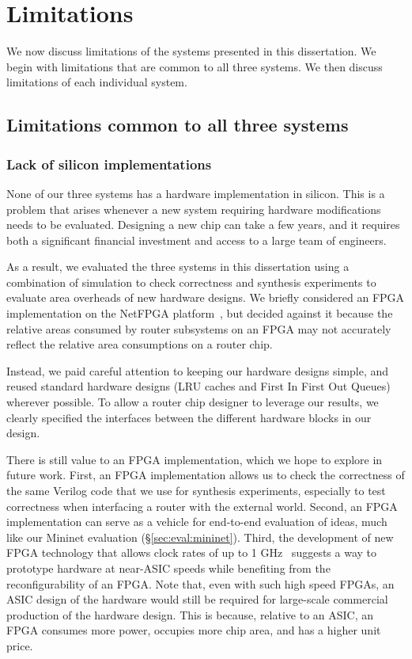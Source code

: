 \chapter{Limitations}
\label{chap:limitations}

We now discuss limitations of the systems presented in this dissertation. We
begin with limitations that are common to all three systems. We then discuss
limitations of each individual system.

\section{Limitations common to all three systems}

\subsection{Lack of silicon implementations} None of our three systems has a
hardware implementation in silicon. This is a problem that arises whenever a
new system requiring hardware modifications needs to be evaluated. Designing a
new chip can take a few years, and it requires both a significant financial
investment and access to a large team of engineers.

 As a result, we evaluated the three systems in this dissertation using a
combination of simulation to check correctness and synthesis experiments to
evaluate area overheads of new hardware designs. We briefly considered an FPGA
implementation on the NetFPGA platform~\cite{netfpga}, but decided against it
because the relative areas consumed by router subsystems on an FPGA may not
accurately reflect the relative area consumptions on a router chip.

Instead, we paid careful attention to keeping our hardware designs simple, and
reused standard hardware designs (\eg LRU caches and First In First Out Queues)
wherever possible. To allow a router chip designer to leverage our results, we
clearly specified the interfaces between the different hardware blocks in our
design.

There is still value to an FPGA implementation, which we hope to explore in
future work. First, an FPGA implementation allows us to check the correctness
of the same Verilog code that we use for synthesis experiments, especially to
test correctness when interfacing a router with the external world. Second, an
FPGA implementation can serve as a vehicle for end-to-end evaluation of ideas,
much like our Mininet evaluation (\S\ref{sec:eval:mininet}).
Third, the development of new FPGA technology that allows clock rates of up to
1 GHz~\cite{hyperflex} suggests a way to prototype hardware at near-ASIC speeds
while benefiting from the reconfigurability of an FPGA. Note that, even with
such high speed FPGAs, an ASIC design of the hardware would still be required
for large-scale commercial production of the hardware design.  This is because,
relative to an ASIC, an FPGA consumes more power, occupies more chip area,
and has a higher unit price.

